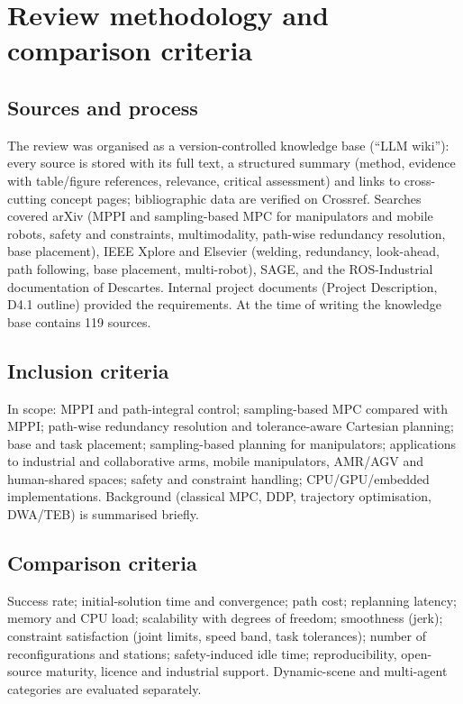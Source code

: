 \section{Review methodology and comparison criteria}\label{sec:method}

\subsection{Sources and process}
The review was organised as a version-controlled knowledge base (``LLM wiki''): every source is stored with its full text, a structured summary (method, evidence with table/figure references, relevance, critical assessment) and links to cross-cutting concept pages; bibliographic data are verified on Crossref. Searches covered arXiv (MPPI and sampling-based MPC for manipulators and mobile robots, safety and constraints, multimodality, path-wise redundancy resolution, base placement), IEEE Xplore and Elsevier (welding, redundancy, look-ahead, path following, base placement, multi-robot), SAGE, and the ROS-Industrial documentation of Descartes. Internal project documents (Project Description, D4.1 outline) provided the requirements. At the time of writing the knowledge base contains 119 sources.

\subsection{Inclusion criteria}
In scope: MPPI and path-integral control; sampling-based MPC compared with MPPI; path-wise redundancy resolution and tolerance-aware Cartesian planning; base and task placement; sampling-based planning for manipulators; applications to industrial and collaborative arms, mobile manipulators, AMR/AGV and human-shared spaces; safety and constraint handling; CPU/GPU/embedded implementations. Background (classical MPC, DDP, trajectory optimisation, DWA/TEB) is summarised briefly.

\subsection{Comparison criteria}
Success rate; initial-solution time and convergence; path cost; replanning latency; memory and CPU load; scalability with degrees of freedom; smoothness (jerk); constraint satisfaction (joint limits, speed band, task tolerances); number of reconfigurations and stations; safety-induced idle time; reproducibility, open-source maturity, licence and industrial support. Dynamic-scene and multi-agent categories are evaluated separately.
